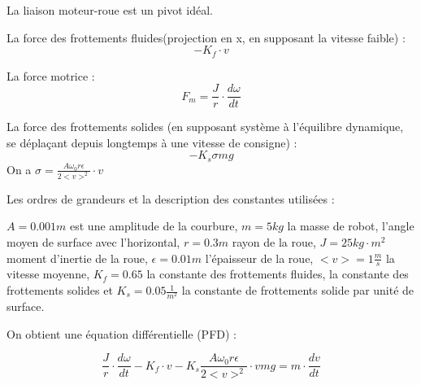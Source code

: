 \documentclass[11pt]{article} %
\begin{document}
La liaison moteur-roue est un pivot idéal.

La force des frottements fluides(projection en x, en supposant la vitesse faible) : \begin{equation} -K_f \cdot v \end{equation}

La force motrice : \begin{equation} F_m = \frac{J}{r} \cdot \frac{d\omega}{dt}\end{equation} 

La force des frottements solides (en supposant système à l'équilibre dynamique, se déplaçant depuis longtemps à une vitesse de consigne) : \begin{equation} -K_s \sigma mg  \end{equation}
On a \begin{math}  \sigma =\frac{A \omega_0 r \epsilon}{2<v>^2} \cdot v \end{math}

Les ordres de grandeurs et la description des constantes utilisées : 

\begin{math} A = 0.001m \end{math} est une amplitude de la courbure,  \begin{math} m=5kg \end{math} la masse de robot, l'angle moyen de surface avec l'horizontal, \begin{math} r=0.3m \end{math} rayon de la roue, \begin{math} J = 25 kg \cdot m^2 \end{math} moment d'inertie de la roue, \begin{math} \epsilon  = 0.01m \end{math} l'épaisseur de la roue, \begin{math} <v>=1 \frac{m}{s} \end{math} la vitesse moyenne, \begin{math} K_f = 0.65 \end{math} la constante des frottements fluides, la constante des frottements solides et \begin{math} K_s = 0.05 \frac{1}{m^2} \end{math} la constante de frottements solide par unité de surface.

On obtient une équation différentielle (PFD) :

\begin{equation} \frac{J}{r} \cdot \frac{d\omega}{dt} - K_f \cdot v - K_s \frac{A \omega_0 r \epsilon}{2<v>^2} \cdot v mg = m \cdot \frac{dv}{dt}\end{equation}
\end{document}
